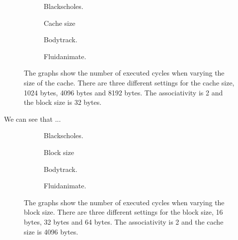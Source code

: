\begin{figure}[H]
    \centering
    \begin{subfigure}[b]{0.33\textwidth}
        \centering
        \caption{Blackscholes.}
        \label{fig:cache_size_blackscholes}
    \end{subfigure}%
    \hfill
    \begin{subfigure}[b]{0.33\textwidth}
        \centering
        Cache size\par\medskip
        \caption{Bodytrack.}
        \label{fig:cache_size_bodytrack}
    \end{subfigure}%
    \hfill
    \begin{subfigure}[b]{0.33\textwidth}
        \centering
        \caption{Fluidanimate.}
        \label{fig:cache_size_fluidanimate}
    \end{subfigure}
    \hfill
    \caption{The graphs show the number of executed cycles when varying the size of the cache. There are three different settings for the cache size, 1024 bytes, 4096 bytes and 8192 bytes. The associativity is 2 and the block size is 32 bytes.}
    \label{fig:cache_size}
\end{figure}

We can see that ... 


\begin{figure}[H]
    \centering
    \begin{subfigure}[b]{0.33\textwidth}
        \centering
        \caption{Blackscholes.}
        \label{fig:block_size_blackscholes}
    \end{subfigure}%
    \hfill
    \begin{subfigure}[b]{0.33\textwidth}
        \centering
        Block size\par\medskip
        \caption{Bodytrack.}
        \label{fig:block_size_bodytrack}
    \end{subfigure}%
    \hfill
    \begin{subfigure}[b]{0.33\textwidth}
        \centering
        \caption{Fluidanimate.}
        \label{fig:block_size_fluidanimate}
    \end{subfigure}
    \hfill
    \caption{The graphs show the number of executed cycles when varying the block size. There are three different settings for the block size, 16 bytes, 32 bytes and 64 bytes. The associativity is 2 and the cache size is 4096 bytes.}
    \label{fig:block_size}
\end{figure}

